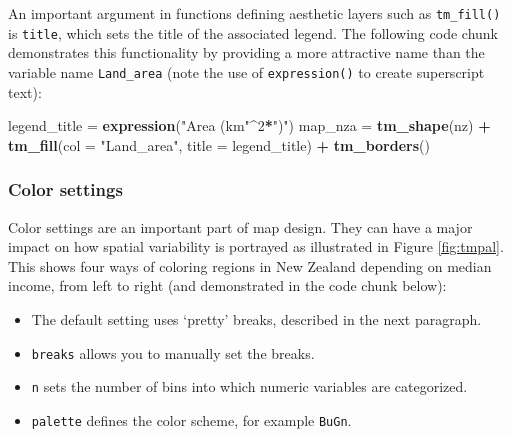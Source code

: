 \documentclass[]{krantz}
\newenvironment{Shaded}{\begin{snugshade}}{\end{snugshade}}
\newcommand{\DataTypeTok}[1]{\textcolor[rgb]{0.27,0.27,0.27}{#1}}
\newcommand{\DecValTok}[1]{\textcolor[rgb]{0.06,0.06,0.06}{#1}}
\newcommand{\KeywordTok}[1]{\textcolor[rgb]{0.27,0.27,0.27}{\textbf{#1}}}
\newcommand{\NormalTok}[1]{#1}
\newcommand{\OperatorTok}[1]{\textcolor[rgb]{0.43,0.43,0.43}{\textbf{#1}}}
\newcommand{\StringTok}[1]{\textcolor[rgb]{0.5,0.5,0.5}{#1}}
\providecommand{\tightlist}{%
  \setlength{\itemsep}{0pt}\setlength{\parskip}{0pt}}
\begin{document}
An important argument in functions defining aesthetic layers such as \texttt{tm\_fill()} is \texttt{title}, which sets the title of the associated legend.
The following code chunk demonstrates this functionality by providing a more attractive name than the variable name \texttt{Land\_area} (note the use of \texttt{expression()} to create superscript text):

\begin{Shaded}
\begin{Highlighting}[]
\NormalTok{legend_title =}\StringTok{ }\KeywordTok{expression}\NormalTok{(}\StringTok{"Area (km"}\OperatorTok{^}\DecValTok{2}\OperatorTok{*}\StringTok{")"}\NormalTok{)}
\NormalTok{map_nza =}\StringTok{ }\KeywordTok{tm_shape}\NormalTok{(nz) }\OperatorTok{+}
\StringTok{  }\KeywordTok{tm_fill}\NormalTok{(}\DataTypeTok{col =} \StringTok{"Land_area"}\NormalTok{, }\DataTypeTok{title =}\NormalTok{ legend_title) }\OperatorTok{+}\StringTok{ }\KeywordTok{tm_borders}\NormalTok{()}
\end{Highlighting}
\end{Shaded}

\hypertarget{color-settings}{%
\subsubsection{Color settings}\label{color-settings}}

Color settings are an important part of map design.
They can have a major impact on how spatial variability is portrayed as illustrated in Figure \ref{fig:tmpal}.
This shows four ways of coloring regions in New Zealand depending on median income, from left to right (and demonstrated in the code chunk below):

\begin{itemize}
\tightlist
\item
  The default setting uses `pretty' breaks, described in the next paragraph.
\item
  \texttt{breaks} allows you to manually set the breaks.
\item
  \texttt{n} sets the number of bins into which numeric variables are categorized.
\item
  \texttt{palette} defines the color scheme, for example \texttt{BuGn}.
\end{itemize}
\end{document}
